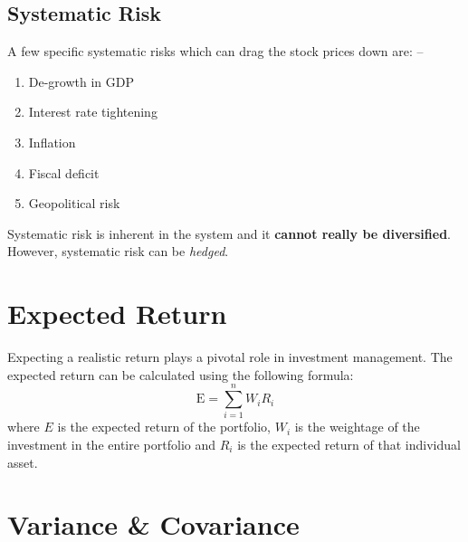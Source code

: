\subsection{Systematic Risk}

A few specific systematic risks which can drag the stock prices down are: –
\begin{enumerate}
  \item De-growth in GDP
  \item Interest rate tightening
  \item Inflation
  \item Fiscal deficit
  \item Geopolitical risk
\end{enumerate}

Systematic risk is inherent in the system and it \textbf{cannot really be diversified}. However, systematic risk can be \emph{hedged}.

\section{Expected Return}
Expecting a realistic return plays a pivotal role in investment management. The expected return can be calculated using the following formula:
\[
  \textrm{E} = \sum_{i=1}^n W_i R_i
\]
where $E$ is the expected return of the portfolio, $W_i$ is the weightage of the investment in the entire portfolio and $R_i$ is the expected return of that individual asset.


\section{Variance \& Covariance}

